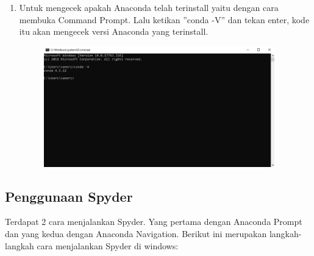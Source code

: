 \begin{enumerate}
	\item Untuk mengecek apakah Anaconda telah terinstall yaitu dengan cara membuka Command Prompt. Lalu ketikan ''conda -V'' dan tekan enter, kode itu akan mengecek versi Anaconda yang terinstall.
	\begin{figure}[H]
		\includegraphics[width=10cm]{figures/diva/10chp1diva.png}
		\centering
	\end{figure}

\end{enumerate}

\subsection{Penggunaan Spyder}

Terdapat 2 cara menjalankan Spyder. Yang pertama dengan Anaconda Prompt dan yang kedua dengan Anaconda Navigation. Berikut ini merupakan langkah-langkah cara menjalankan Spyder di windows:

